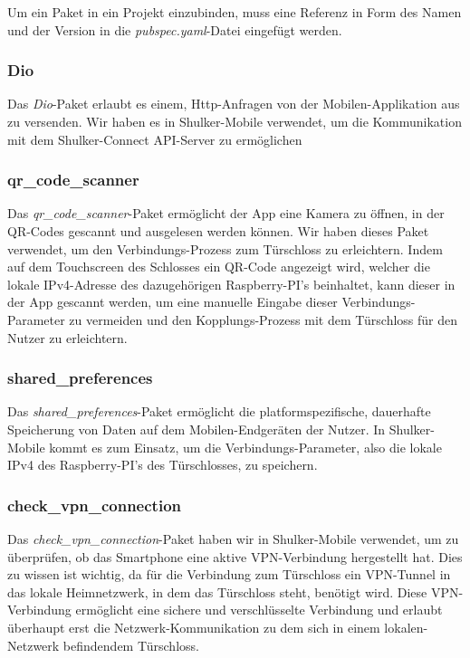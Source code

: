Um ein Paket in ein Projekt einzubinden, muss eine Referenz in Form des Namen und der Version 
in die \textit{pubspec.yaml}-Datei eingefügt werden.


\subsubsection{Dio}
Das \textit{Dio}-Paket erlaubt es einem, Http-Anfragen von der Mobilen-Applikation aus zu versenden.
Wir haben es in Shulker-Mobile verwendet, um die Kommunikation mit dem Shulker-Connect API-Server zu ermöglichen

\subsubsection{qr\_code\_scanner}
Das \textit{qr\_code\_scanner}-Paket ermöglicht der App eine Kamera zu öffnen, in der 
QR-Codes gescannt und ausgelesen werden können. Wir haben dieses Paket verwendet, um den
Verbindungs-Prozess zum Türschloss zu erleichtern. Indem auf dem Touchscreen des Schlosses
ein QR-Code angezeigt wird, welcher die lokale IPv4-Adresse des dazugehörigen Raspberry-PI's
beinhaltet, kann dieser in der App gescannt werden, um eine manuelle Eingabe dieser Verbindungs-Parameter
zu vermeiden und den Kopplungs-Prozess mit dem Türschloss für den Nutzer zu erleichtern. 

\subsubsection{shared\_preferences}
Das \textit{shared\_preferences}-Paket ermöglicht die platformspezifische, dauerhafte Speicherung
von Daten auf dem Mobilen-Endgeräten der Nutzer. In Shulker-Mobile kommt es zum Einsatz, um die 
Verbindungs-Parameter, also die lokale IPv4 des Raspberry-PI's des Türschlosses, zu speichern.

\subsubsection{check\_vpn\_connection}
Das \textit{check\_vpn\_connection}-Paket haben wir in Shulker-Mobile verwendet, um zu überprüfen, ob 
das Smartphone eine aktive VPN-Verbindung hergestellt hat. Dies zu wissen ist wichtig, da für die Verbindung zum Türschloss 
ein VPN-Tunnel in das lokale Heimnetzwerk, in dem das Türschloss steht, benötigt wird. Diese VPN-Verbindung ermöglicht eine
sichere und verschlüsselte Verbindung und erlaubt überhaupt erst die Netzwerk-Kommunikation zu dem sich in einem lokalen-Netzwerk
befindendem Türschloss.

